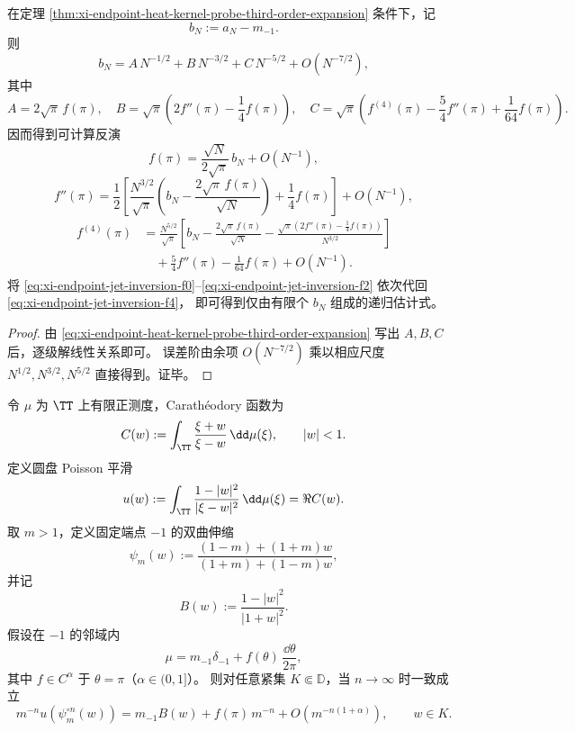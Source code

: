 \begin{corollary}[端点局部几何喷流的渐近反演]\label{cor:xi-endpoint-local-jet-inversion}
在定理 \ref{thm:xi-endpoint-heat-kernel-probe-third-order-expansion} 条件下，记
\[
b_N:=a_N-m_{-1}.
\]
则
\[
b_N=A\,N^{-1/2}+B\,N^{-3/2}+C\,N^{-5/2}+O(N^{-7/2}),
\]
其中
\[
A=2\sqrt\pi\,f(\pi),\quad
B=\sqrt\pi\!\left(2f''(\pi)-\frac14 f(\pi)\right),\quad
C=\sqrt\pi\!\left(f^{(4)}(\pi)-\frac54 f''(\pi)+\frac1{64}f(\pi)\right).
\]
因而得到可计算反演
\begin{equation}\label{eq:xi-endpoint-jet-inversion-f0}
f(\pi)=\frac{\sqrt N}{2\sqrt\pi}\,b_N+O(N^{-1}),
\end{equation}
\begin{equation}\label{eq:xi-endpoint-jet-inversion-f2}
f''(\pi)
=\frac12\!\left[
\frac{N^{3/2}}{\sqrt\pi}\!\left(
b_N-\frac{2\sqrt\pi\,f(\pi)}{\sqrt N}
\right)
+\frac14 f(\pi)\right]
+O(N^{-1}),
\end{equation}
\begin{equation}\label{eq:xi-endpoint-jet-inversion-f4}
\begin{aligned}
f^{(4)}(\pi)
&=\frac{N^{5/2}}{\sqrt\pi}\!\left[
b_N-\frac{2\sqrt\pi\,f(\pi)}{\sqrt N}
-\frac{\sqrt\pi\left(2f''(\pi)-\tfrac14 f(\pi)\right)}{N^{3/2}}
\right]\\
&\quad+\frac54 f''(\pi)-\frac1{64}f(\pi)+O(N^{-1}).
\end{aligned}
\end{equation}
将 \eqref{eq:xi-endpoint-jet-inversion-f0}--\eqref{eq:xi-endpoint-jet-inversion-f2} 依次代回 \eqref{eq:xi-endpoint-jet-inversion-f4}，
即可得到仅由有限个 \(b_N\) 组成的递归估计式。
\end{corollary}

\begin{proof}
由 \eqref{eq:xi-endpoint-heat-kernel-probe-third-order-expansion} 写出 \(A,B,C\) 后，逐级解线性关系即可。
误差阶由余项 \(O(N^{-7/2})\) 乘以相应尺度 \(N^{1/2},N^{3/2},N^{5/2}\) 直接得到。证毕。
\end{proof}

\begin{theorem}[端点伸缩递归的两项展开与误差指数]\label{thm:xi-endpoint-recursive-rescaling-two-term}
令 \(\mu\) 为 \(\TT\) 上有限正测度，Carath\'eodory 函数为
\[
C(w):=\int_{\TT}\frac{\xi+w}{\xi-w}\,\dd\mu(\xi),\qquad |w|<1.
\]
定义圆盘 Poisson 平滑
\[
u(w):=\int_{\TT}\frac{1-|w|^2}{|\xi-w|^2}\,\dd\mu(\xi)=\Re C(w).
\]
取 \(m>1\)，定义固定端点 \(-1\) 的双曲伸缩
\[
\psi_m(w):=\frac{(1-m)+(1+m)w}{(1+m)+(1-m)w},
\]
并记
\[
B(w):=\frac{1-|w|^2}{|1+w|^2}.
\]
假设在 \(-1\) 的邻域内
\[
\mu=m_{-1}\delta_{-1}+f(\theta)\,\frac{\dd\theta}{2\pi},
\]
其中 \(f\in C^\alpha\) 于 \(\theta=\pi\)（\(\alpha\in(0,1]\)）。
则对任意紧集 \(K\Subset\mathbb D\)，当 \(n\to\infty\) 时一致成立
\begin{equation}\label{eq:xi-endpoint-recursive-rescaling-two-term}
m^{-n}u\!\left(\psi_m^{\circ n}(w)\right)
=m_{-1}B(w)+f(\pi)\,m^{-n}+O\!\left(m^{-n(1+\alpha)}\right),\qquad w\in K.
\end{equation}
\end{theorem}

